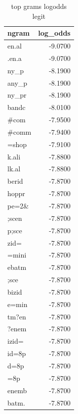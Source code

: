 \begin{table}[htbp]
\caption{top grams logodds legit}
\label{tab:top_grams_logodds_legit}
\begin{tabular}{lr}
\toprule
ngram & log_odds \\
\midrule
en.al & -9.0700 \\
.en.a & -9.0700 \\
ny\_p & -8.1900 \\
any\_p & -8.1900 \\
ny\_pr & -8.1900 \\
bandc & -8.0100 \\
\#com & -7.9500 \\
\#comm & -7.9400 \\
=shop & -7.9100 \\
k.ali & -7.8800 \\
lk.al & -7.8800 \\
berid & -7.8700 \\
hoppr & -7.8700 \\
pe=2\& & -7.8700 \\
;scen & -7.8700 \\
p;sce & -7.8700 \\
zid= & -7.8700 \\
=mini & -7.8700 \\
ebatm & -7.8700 \\
;sce & -7.8700 \\
bizid & -7.8700 \\
e=min & -7.8700 \\
tm?en & -7.8700 \\
?enem & -7.8700 \\
izid= & -7.8700 \\
id=8p & -7.8700 \\
d=8p & -7.8700 \\
=8p & -7.8700 \\
enemb & -7.8700 \\
batm. & -7.8700 \\
\bottomrule
\end{tabular}
\end{table}
